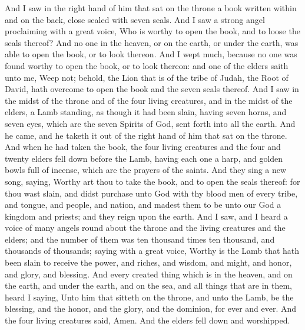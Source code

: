 And I saw in the right hand of him that sat on the throne a book written within and on the back, close sealed with seven seals. And I saw a strong angel proclaiming with a great voice, Who is worthy to open the book, and to loose the seals thereof? And no one in the heaven, or on the earth, or under the earth, was able to open the book, or to look thereon. And I wept much, because no one was found worthy to open the book, or to look thereon: and one of the elders saith unto me, Weep not; behold, the Lion that is of the tribe of Judah, the Root of David, hath overcome to open the book and the seven seals thereof. And I saw in the midst of the throne and of the four living creatures, and in the midst of the elders, a Lamb standing, as though it had been slain, having seven horns, and seven eyes, which are the seven Spirits of God, sent forth into all the earth. And he came, and he taketh it out of the right hand of him that sat on the throne. And when he had taken the book, the four living creatures and the four and twenty elders fell down before the Lamb, having each one a harp, and golden bowls full of incense, which are the prayers of the saints. And they sing a new song, saying, Worthy art thou to take the book, and to open the seals thereof: for thou wast slain, and didst purchase unto God with thy blood men of every tribe, and tongue, and people, and nation, and madest them to be unto our God a kingdom and priests; and they reign upon the earth.  And I saw, and I heard a voice of many angels round about the throne and the living creatures and the elders; and the number of them was ten thousand times ten thousand, and thousands of thousands; saying with a great voice, Worthy is the Lamb that hath been slain to receive the power, and riches, and wisdom, and might, and honor, and glory, and blessing.  And every created thing which is in the heaven, and on the earth, and under the earth, and on the sea, and all things that are in them, heard I saying, Unto him that sitteth on the throne, and unto the Lamb, be the blessing, and the honor, and the glory, and the dominion, for ever and ever.  And the four living creatures said, Amen. And the elders fell down and worshipped. 

